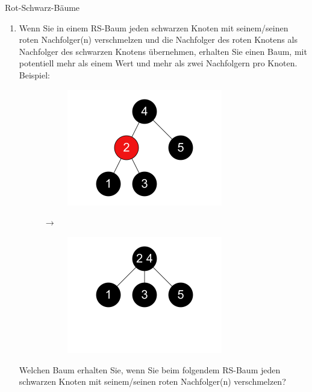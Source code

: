 \documentclass[11pt,a4paper]{article}
\begin{document}
\begin{aufgabe}{2}{Rot-Schwarz-Bäume}
\begin{enumerate}
        \item Wenn Sie in einem RS-Baum jeden schwarzen Knoten mit seinem/seinen roten Nachfolger(n) verschmelzen und die Nachfolger des roten Knotens als Nachfolger des schwarzen Knotens übernehmen, erhalten Sie einen Baum, mit potentiell mehr als einem Wert und mehr als zwei Nachfolgern pro Knoten.
        Beispiel:
        \begin{figure}[h!]
            \centering
            \begin{subfigure}[c]{0.2\textwidth}
                \centering
                \includegraphics[width=0.8\textwidth]{img/2d_1}
            \end{subfigure}
            $\rightarrow$
            \begin{subfigure}[c]{0.2\textwidth}
                \centering
                \includegraphics[width=0.8\textwidth]{img/2d_2}
            \end{subfigure}
        \end{figure}
        \FloatBarrier
        Welchen Baum erhalten Sie, wenn Sie beim folgendem RS-Baum jeden schwarzen Knoten mit seinem/seinen roten Nachfolger(n) verschmelzen?

\end{enumerate}
\end{aufgabe}
\end{document}
